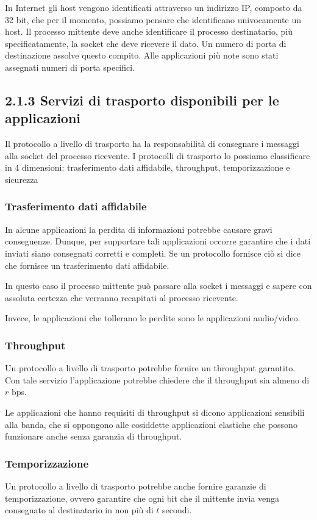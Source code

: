 \documentclass{book}
\begin{document}
In Internet gli host vengono identificati attraverso un indirizzo IP, composto da 32 bit, che per il momento, possiamo pensare che identificano univocamente un host. Il processo mittente deve anche identificare il processo destinatario, più specificatamente, la socket che deve ricevere il dato. Un numero di porta di destinazione assolve questo compito. Alle applicazioni più note sono stati assegnati numeri di porta specifici.

\subsection*{2.1.3 Servizi di trasporto disponibili per le applicazioni}
Il protocollo a livello di trasporto ha la responsabilità di consegnare i messaggi alla socket del processo ricevente. I protocolli di trasporto lo possiamo classificare in 4 dimensioni: trasferimento dati affidabile, throughput, temporizzazione e sicurezza

\subsubsection*{Trasferimento dati affidabile}
In alcune applicazioni la perdita di informazioni potrebbe causare gravi conseguenze. Dunque, per supportare tali applicazioni occorre garantire che i dati inviati siano consegnati corretti e completi. Se un protocollo fornisce ciò si dice che fornisce un trasferimento dati affidabile.

In questo caso il processo mittente può passare alla socket i messaggi e sapere con assoluta certezza che verranno recapitati al processo ricevente.

Invece, le applicazioni che tollerano le perdite sono le applicazioni audio/video.

\subsubsection*{Throughput}
Un protocollo a livello di trasporto potrebbe fornire un throughput garantito. Con tale servizio l'applicazione potrebbe chiedere che il throughput sia almeno di $r$ bps.

Le applicazioni che hanno requisiti di throughput si dicono applicazioni sensibili alla banda, che si oppongono alle cosiddette applicazioni elastiche che possono funzionare anche senza garanzia di throughput.

\subsubsection*{Temporizzazione}
Un protocollo a livello di trasporto potrebbe anche fornire garanzie di temporizzazione, ovvero garantire che ogni bit che il mittente invia venga consegnato al destinatario in non più di $t$ secondi.
\end{document}
